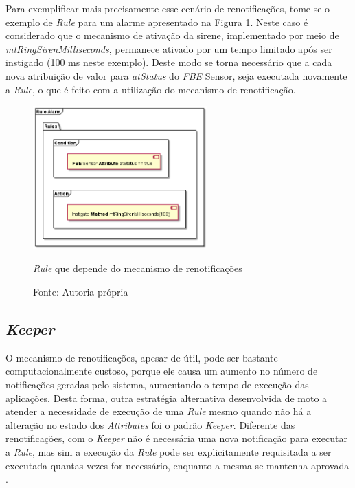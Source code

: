 \FloatBarrier

Para exemplificar mais precisamente esse cenário de renotificações, tome-se o
exemplo de \textit{Rule} para um alarme apresentado na Figura
\ref{fig:ex_rule_renotif}. Neste caso é considerado que o mecanismo de ativação
da sirene, implementado por meio de \textit{mtRingSirenMilliseconds}, permanece
ativado por um tempo limitado após ser instigado (100 ms neste exemplo). Deste
modo se torna necessário que a cada nova atribuição de valor para
\textit{atStatus} do \textit{FBE} Sensor, seja executada novamente a
\textit{Rule}, o que é feito com a utilização do mecanismo de renotificação.

\begin{figure}[!htb]
  \centering
  \includegraphics[width=0.6\textwidth]{../out/diagrams/rule_renotif/rules_renotif.png}
  \smallskip
  \caption{\textit{Rule} que depende do mecanismo de renotificações}
  \caption*{Fonte: Autoria própria}
  \label{fig:ex_rule_renotif}
\end{figure}

\subsection{\textit{Keeper}}

O mecanismo de renotificações, apesar de útil, pode ser bastante
computacionalmente custoso, porque ele causa um aumento no número de
notificações geradas pelo sistema, aumentando o tempo de execução das
aplicações. Desta forma, outra estratégia alternativa desenvolvida de moto a
atender a necessidade de execução de uma \textit{Rule} mesmo quando não há a
alteração no estado dos \textit{Attributes} foi o padrão \textit{Keeper}.
Diferente das renotificações, com o \textit{Keeper} não é necessária uma nova
notificação para executar a \textit{Rule}, mas sim a execução da \textit{Rule}
pode ser explicitamente requisitada a ser executada quantas vezes for
necessário, enquanto a mesma se mantenha aprovada \cite{muchalski_2012}.

